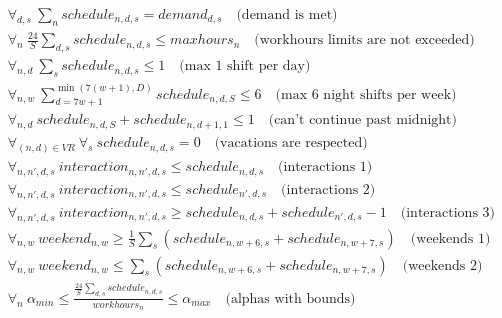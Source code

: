 \documentclass{article}
\begin{document}
\begin{align*}
&\forall_{d,s}\ \sum_n schedule_{n,d,s} = demand_{d, s}\quad \text{(demand is met)} \\
&\forall_{n}\ \frac{24}S \sum_{d, s} schedule_{n,d,s} \leq maxhours_n \quad \text{(workhours limits are not exceeded)} \\
&\forall_{n,d}\ \sum_s schedule_{n,d,s} \leq 1\quad \text{(max 1 shift per day)} \\
&\forall_{n,w}\ \sum_{d=7w+1}^{\min(7(w+1), D)} schedule_{n,d,S} \leq 6\quad \text{(max 6 night shifts per week)} \\
&\forall_{n,d}\ schedule_{n,d,S}+schedule_{n,d+1,1} \leq 1\quad \text{(can't continue past midnight)} \\
&\forall_{(n,d)\in VR}\ \forall_s\ schedule_{n,d,s} = 0\quad \text{(vacations are respected)} \\
&\forall_{n,n',d,s}\ interaction_{n,n',d,s} \leq schedule_{n,d,s}\quad \text{(interactions 1)} \\
&\forall_{n,n',d,s}\ interaction_{n,n',d,s} \leq schedule_{n',d,s}\quad \text{(interactions 2)} \\
&\forall_{n,n',d,s}\ interaction_{n,n',d,s} \geq schedule_{n,d,s}+schedule_{n',d,s}-1\quad \text{(interactions 3)} \\
&\forall_{n, w}\ weekend_{n, w} \geq \frac{1}{S}\sum_s (schedule_{n, w+6, s} + schedule_{n, w+7, s}) \quad \text{(weekends 1)} \\
&\forall_{n, w}\ weekend_{n, w} \leq \sum_s (schedule_{n, w+6, s} + schedule_{n, w+7, s}) \quad \text{(weekends 2)} \\
&\forall_{n}\ \alpha_{min} \leq \frac{\frac{24}{S}\sum_{d,s}schedule_{n,d,s}}{workhours_n} \leq \alpha_{max}\quad \text{(alphas with bounds)}
\end{align*}
\end{document}
